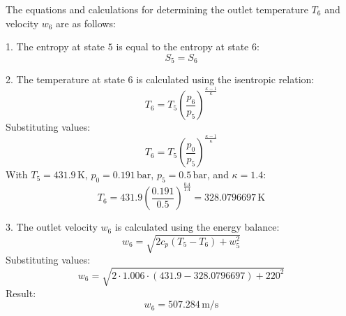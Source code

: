 The equations and calculations for determining the outlet temperature \(T_6\) and velocity \(w_6\) are as follows:  

1. The entropy at state \(5\) is equal to the entropy at state \(6\):  
   \[
   S_5 = S_6
   \]

2. The temperature at state \(6\) is calculated using the isentropic relation:  
   \[
   T_6 = T_5 \left( \frac{p_6}{p_5} \right)^{\frac{\kappa - 1}{\kappa}}
   \]
   Substituting values:  
   \[
   T_6 = T_5 \left( \frac{p_0}{p_5} \right)^{\frac{\kappa - 1}{\kappa}}
   \]
   With \(T_5 = 431.9 \, \text{K}\), \(p_0 = 0.191 \, \text{bar}\), \(p_5 = 0.5 \, \text{bar}\), and \(\kappa = 1.4\):  
   \[
   T_6 = 431.9 \left( \frac{0.191}{0.5} \right)^{\frac{0.4}{1.4}} = 328.0796697 \, \text{K}
   \]

3. The outlet velocity \(w_6\) is calculated using the energy balance:  
   \[
   w_6 = \sqrt{2 c_p (T_5 - T_6) + w_5^2}
   \]
   Substituting values:  
   \[
   w_6 = \sqrt{2 \cdot 1.006 \cdot (431.9 - 328.0796697) + 220^2}
   \]
   Result:  
   \[
   w_6 = 507.284 \, \text{m/s}
   \]